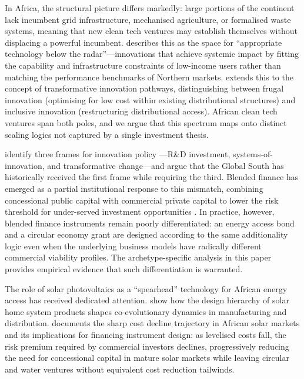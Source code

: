 \documentclass[review,12pt]{elsarticle}
\begin{document}
In Africa, the structural picture differs markedly: large portions of
the continent lack incumbent grid infrastructure, mechanised
agriculture, or formalised waste systems, meaning that new clean tech
ventures may establish themselves without displacing a powerful
incumbent. \citet{kaplinsky2011schumacher} describes this as the
space for ``appropriate technology below the radar''---innovations
that achieve systemic impact by fitting the capability and
infrastructure constraints of low-income users rather than matching
the performance benchmarks of Northern markets. \citet{onsongo2019frugal}
extends this to the concept of transformative innovation pathways,
distinguishing between frugal innovation (optimising for low cost
within existing distributional structures) and inclusive innovation
(restructuring distributional access). African clean tech ventures
span both poles, and we argue that this spectrum maps onto distinct
scaling logics not captured by a single investment thesis.

\citet{schot2018three} identify three frames for innovation policy
---R\&D investment, systems-of-innovation, and transformative
change---and argue that the Global South has historically received the
first frame while requiring the third. Blended finance has emerged as
a partial institutional response to this mismatch, combining
concessional public capital with commercial private capital to lower
the risk threshold for under-served investment opportunities
\citep{reimsbach2022blended}. In practice, however, blended finance
instruments remain poorly differentiated: an energy access bond and a
circular economy grant are designed according to the same additionality
logic even when the underlying business models have radically different
commercial viability profiles. The archetype-specific analysis in this
paper provides empirical evidence that such differentiation is
warranted.

The role of solar photovoltaics as a ``spearhead'' technology for
African energy access has received dedicated attention.
\citet{huenteler2016solar} show how the design hierarchy of solar
home system products shapes co-evolutionary dynamics in manufacturing
and distribution. \citet{irena2022africa} documents the sharp cost
decline trajectory in African solar markets and its implications for
financing instrument design: as levelised costs fall, the risk
premium required by commercial investors declines, progressively
reducing the need for concessional capital in mature solar markets
while leaving circular and water ventures without equivalent cost
reduction tailwinds.
\end{document}
